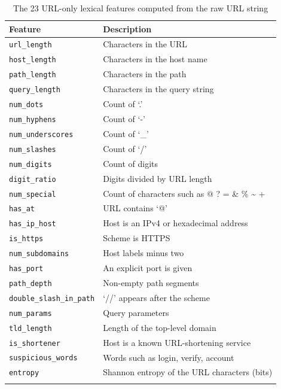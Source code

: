 \documentclass[pdflatex,sn-mathphys-num]{sn-jnl}%
\theoremstyle{thmstyleone}%
\theoremstyle{thmstyletwo}%
\theoremstyle{thmstylethree}%
\begin{document}
\begin{table}[htbp]
\caption{The 23 URL-only lexical features computed from the raw URL string}\label{tab:lexical}%
\begin{tabular}{@{}ll@{}}
\toprule
Feature & Description\\
\midrule
\texttt{url\_length} & Characters in the URL \\
\texttt{host\_length} & Characters in the host name \\
\texttt{path\_length} & Characters in the path \\
\texttt{query\_length} & Characters in the query string \\
\texttt{num\_dots} & Count of `.' \\
\texttt{num\_hyphens} & Count of `-' \\
\texttt{num\_underscores} & Count of `\_' \\
\texttt{num\_slashes} & Count of `/' \\
\texttt{num\_digits} & Count of digits \\
\texttt{digit\_ratio} & Digits divided by URL length \\
\texttt{num\_special} & Count of characters such as @ ? = \& \% \textasciitilde{} + \\
\texttt{has\_at} & URL contains `@' \\
\texttt{has\_ip\_host} & Host is an IPv4 or hexadecimal address \\
\texttt{is\_https} & Scheme is HTTPS \\
\texttt{num\_subdomains} & Host labels minus two \\
\texttt{has\_port} & An explicit port is given \\
\texttt{path\_depth} & Non-empty path segments \\
\texttt{double\_slash\_in\_path} & `//' appears after the scheme \\
\texttt{num\_params} & Query parameters \\
\texttt{tld\_length} & Length of the top-level domain \\
\texttt{is\_shortener} & Host is a known URL-shortening service \\
\texttt{suspicious\_words} & Words such as login, verify, account \\
\texttt{entropy} & Shannon entropy of the URL characters (bits) \\
\botrule
\end{tabular}
\end{table}
\end{document}
